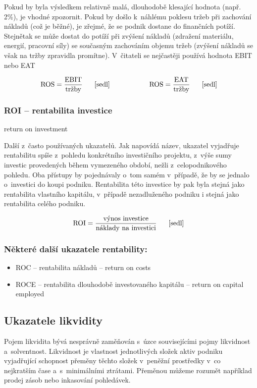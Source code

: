 Pokud by byla výsledkem relativně malá, dlouhodobě klesající hodnota (např. 2\%), je vhodné zpozornit. Pokud by došlo k~náhlému poklesu tržeb při zachování nákladů (což je běžné), je zřejmé, že se podnik dostane do finančních potíží. Stejnětak se může dostat do potíží při zvýšení nákladů (zdražení materiálu, energií, pracovní síly) se současným zachováním objemu tržeb (zvýšení nákladů se však na tržby zpravidla promítne). 
V~čitateli se nejčastěji používá hodnota EBIT nebo EAT

$$\vz{ROS}{EBIT}{tržby} \scite{sedl} \hspace{2cm} \vz{ROS}{EAT}{tržby} \scite{sedl}$$ 

\pagebreak
\subsubsection{ROI -- rentabilita investice}
return on investment

Další z~často používaných ukazatelů. Jak napovídá název, ukazatel vyjadřuje rentabilitu spíše z~pohledu konkrétního investičního projektu, z~výše sumy investic provedených během vymezeného období, nežli z~celopodnikového pohledu. Oba přístupy by pojednávaly o~tom samém v~případě, že by se jednalo o~investici do koupi podniku. Rentabilita této investice by pak byla stejná jako rentabilita vlastního kapitálu, v~případě nezadluženého podniku i stejná jako rentabilita celého podniku.

$$\vz{ROI}{výnos investice}{náklady na investici} \scite{sedl} $$ 

\subsubsection{Některé další ukazatele rentability:}
\begin{itemize}
\item{ROC -- rentabilita nákladů} -- return on costs
\item{ROCE -- rentabilita dlouhodobě investovaného kapitálu} -- return on capital employed
\end{itemize}







\subsection{Ukazatele likvidity}
Pojem likvidita bývá nesprávně zaměňován s~úzce souvisejícími pojmy likvidnost a~solventnost. Likvidnost je vlastnost jednotlivých složek aktiv podniku vyjadřující schopnost přeměny těchto složek v~peněžní prostředky v~co nejkratším čase a~s~minimálními ztrátami.\cite{nyvlt} Přeměnou můžeme rozumět například prodej zásob nebo inkasování pohledávek. 

